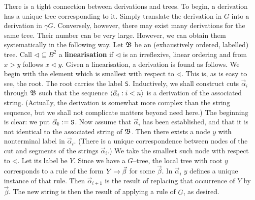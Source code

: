 There is a tight connection between derivations and trees.
To begin, a derivation has a unique tree corresponding to it.
Simply translate the derivation in $G$ into a derivation
in $\gamma G$. Conversely, however, there may exist many
derivations for the same tree. Their number can be very large.
However, we can obtain them systematically in the following way.
Let $\mathfrak{B}$ be an (exhaustively ordered, labelled) tree.
Call $\lhd \subseteq B^2$ a \textbf{linearisation} if $\lhd$ is an
irreflexive, linear ordering and from $x > y$ follows $x \lhd y$.
Given a linearisation, a derivation is found as follows. We begin
with the element which is smallest with respect to $\lhd$. This
is, as is easy to see, the root. The root carries the label {\tt S}.
Inductively, we shall construct cuts $\vec{\alpha}_i$ through
$\mathfrak{B}$ such that the sequence $\langle \vec{\alpha}_i : i < n\rangle$ is a
derivation of the associated string. (Actually, the derivation is
somewhat more complex than the string sequence, but we shall not
complicate matters beyond need here.) The beginning is clear: we put 
$\vec{\alpha}_0 := \mbox{\tt S}$. Now assume that $\vec{\alpha}_i$ has
been established, and that it is not identical to the associated
string of $\mathfrak{B}$. Then there exists a node $y$ with nonterminal
label in $\vec{\alpha}_i$. (There is a unique correspondence
between nodes of the cut and segments of the strings
$\vec{\alpha}_i$.) We take the smallest such node with respect to
$\lhd$. Let its label be $Y$. Since we have a $G$--tree, the local
tree with root $y$ corresponds to a rule of the form $Y \rightarrow
\vec{\beta}$ for some $\vec{\beta}$. In $\vec{\alpha}_i$ $y$
defines a unique instance of that rule. Then $\vec{\alpha}_{i+1}$
is the result of replacing that occurrence of $Y$ by
$\vec{\beta}$. The new string is then the result of applying a
rule of $G$, as desired.

